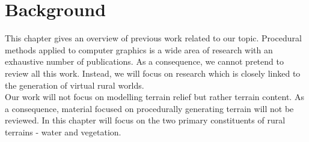 
\chapter{Background}

This chapter gives an overview of previous work related to our topic. Procedural methods applied to computer graphics is a wide area of research with an exhaustive number of publications. As a consequence, we cannot pretend to review all this work. Instead, we will focus on research which is closely linked to the generation of virtual rural worlds. \\

Our work will not focus on modelling terrain relief but rather terrain content. As a consequence, material focused on procedurally generating terrain will not be reviewed. In this chapter will focus on the two primary constituents of rural terrains - water and vegetation.